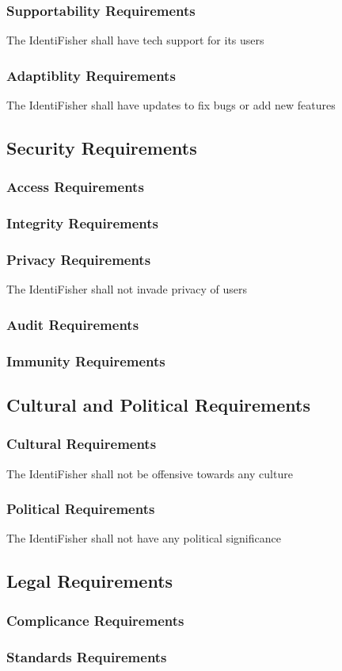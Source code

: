 \documentclass{article}
\begin{document}
\subsubsection{Supportability Requirements}
The IdentiFisher shall have tech support for its users
\subsubsection{Adaptiblity Requirements}
The IdentiFisher shall have updates to fix bugs or add new features

\subsection{Security Requirements}
\subsubsection{Access Requirements}
\subsubsection{Integrity Requirements}
\subsubsection{Privacy Requirements}
The IdentiFisher shall not invade privacy of users
\subsubsection{Audit Requirements}
\subsubsection{Immunity Requirements}

\subsection{Cultural and Political Requirements}
\subsubsection{Cultural Requirements}
The IdentiFisher shall not be offensive towards any culture
\subsubsection{Political Requirements}
The IdentiFisher shall not have any political significance

\subsection{Legal Requirements}
\subsubsection{Complicance Requirements}
\subsubsection{Standards Requirements}
\end{document}
